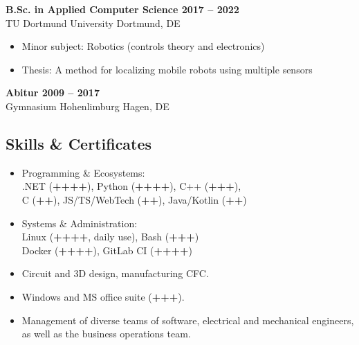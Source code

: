 \documentclass[a4paper,11pt]{article}
\newcommand{\subsectionskip}[0]{\vspace{0.125cm}}
\newcommand{\col}[2]{\textcolor[HTML]{#1}{#2}}
\begin{document}
\begin{minipage}[t]{0.65\textwidth}
    \subsectionskip

    \col{72788a}{\textbf{B.Sc. in Applied Computer Science \hfill 2017 -- 2022}} \\
    TU Dortmund University \hfill Dortmund, DE
    \begin{itemize}
        \small
        \item Minor subject: Robotics (controls theory and electronics)
        \item Thesis: A method for localizing mobile robots using multiple sensors
    \end{itemize}

    \subsectionskip

    \col{72788a}{\textbf{Abitur \hfill 2009 -- 2017}} \\
    Gymnasium Hohenlimburg \hfill Hagen, DE

    \vspace{-0.5cm} %

    \begin{minipage}[t]{0.625\textwidth}
        \col{6c84ac}{\section*{Skills \& Certificates}}
        \begin{itemize}
            \small
            \item Programming \& Ecosystems:\\
            .NET (\textbf{++++}), Python (\textbf{++++}), C++ (\textbf{+++}),\\
            C (\textbf{++}), JS/TS/WebTech (\textbf{++}), Java/Kotlin (\textbf{++})

            \item Systems \& Administration:\\
            Linux (\textbf{++++}, daily use), Bash (\textbf{+++}) \\
            Docker (\textbf{++++}), GitLab CI (\textbf{++++})

            \item Circuit and 3D design, manufacturing CFC.

            \item Windows and MS office suite (\textbf{+++}).

            \item Management of diverse teams of software, electrical and mechanical engineers, as well as the business operations team.


\end{itemize}
\end{minipage}
\end{minipage}
\end{document}
